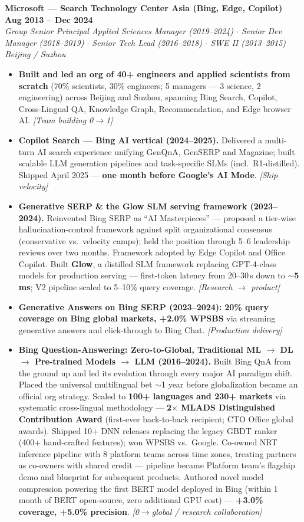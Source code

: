 \documentclass[10.5pt,letterpaper]{article}
\newcommand{\role}[4]{%
  \noindent\textbf{#1} \hfill \textbf{#3}\\
  \textit{#2} \hfill \textit{#4}\par\vspace{2pt}}
\newcommand{\lp}[1]{\textcolor{blue!55!black}{\small\textit{[#1]}}}
\begin{document}
\vspace{4pt}
\role{Microsoft --- Search Technology Center Asia (Bing, Edge, Copilot)}{Group Senior Principal Applied Sciences Manager (2019--2024) $\cdot$ Senior Dev Manager (2018--2019) $\cdot$ Senior Tech Lead (2016--2018) $\cdot$ SWE II (2013--2015)}{Aug 2013 -- Dec 2024}{Beijing / Suzhou}
\begin{itemize}
  \item \textbf{Built and led an org of 40+ engineers and applied scientists from scratch} (70\% scientists, 30\% engineers; 5 managers --- 3 science, 2 engineering) across Beijing and Suzhou, spanning Bing Search, Copilot, Cross-Lingual QA, Knowledge Graph, Recommendation, and Edge browser AI. \lp{Team building 0$\to$1}
  \item \textbf{Copilot Search --- Bing AI vertical (2024--2025).} Delivered a multi-turn AI search experience unifying GenQnA, GenSERP and Magazine; built scalable LLM generation pipelines and task-specific SLMs (incl.\ R1-distilled). Shipped April 2025 --- \textbf{one month before Google's AI Mode}. \lp{Ship velocity}
  \item \textbf{Generative SERP \& the Glow SLM serving framework (2023--2024).} Reinvented Bing SERP as ``AI Masterpieces'' --- proposed a tier-wise hallucination-control framework against split organizational consensus (conservative vs.\ velocity camps); held the position through 5--6 leadership reviews over two months. Framework adopted by Edge Copilot and Office Copilot. Built \textbf{Glow}, a distilled SLM framework replacing GPT-4-class models for production serving --- first-token latency from 20--30\,s down to \textbf{$\sim$5\,ms}; V2 pipeline scaled to 5--10\% query coverage. \lp{Research $\to$ product}
  \item \textbf{Generative Answers on Bing SERP (2023--2024):} \textbf{20\% query coverage on Bing global markets, +2.0\% WPSBS} via streaming generative answers and click-through to Bing Chat. \lp{Production delivery}
  \item \textbf{Bing Question-Answering: Zero-to-Global, Traditional ML $\to$ DL $\to$ Pre-trained Models $\to$ LLM (2016--2024).} Built Bing QnA from the ground up and led its evolution through every major AI paradigm shift. Placed the universal multilingual bet $\sim$1 year before globalization became an official org strategy. Scaled to \textbf{100+ languages and 230+ markets} via systematic cross-lingual methodology --- \textbf{2$\times$ MLADS Distinguished Contribution Award} (first-ever back-to-back recipient; CTO Office global awards). Shipped 10+ DNN releases replacing the legacy GBDT ranker (400+ hand-crafted features); won WPSBS vs.\ Google. Co-owned NRT inference pipeline with 8 platform teams across time zones, treating partners as co-owners with shared credit --- pipeline became Platform team's flagship demo and blueprint for subsequent products. Authored novel model compression powering the first BERT model deployed in Bing (within 1 month of BERT open-source, zero additional GPU cost) --- \textbf{+3.0\% coverage, +5.0\% precision}. \lp{0$\to$global / research collaboration}

\end{itemize}
\end{document}
